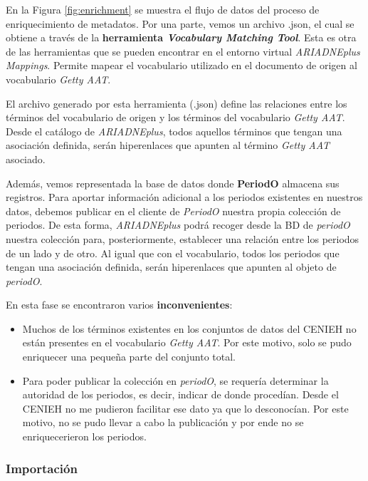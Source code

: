 En la Figura \ref{fig:enrichment} se muestra el flujo de datos del proceso de
enriquecimiento de metadatos. Por una parte, vemos un archivo .json, el
cual se obtiene a través de la \textbf{herramienta \emph{Vocabulary Matching
Tool}}. Esta es otra de las herramientas que se pueden encontrar en el
entorno virtual \emph{ARIADNEplus Mappings}. Permite mapear el vocabulario utilizado
en el documento de origen al vocabulario \emph{Getty AAT}.


El archivo generado por esta herramienta (.json) define las relaciones
entre los términos del vocabulario de origen y los términos del
vocabulario \emph{Getty AAT}. Desde el catálogo de \emph{ARIADNEplus}, todos
aquellos términos que tengan una asociación definida, serán hiperenlaces
que apunten al término \emph{Getty AAT} asociado.

Además, vemos representada la base de datos donde \textbf{PeriodO} almacena sus
registros. Para aportar información adicional a los periodos existentes
en nuestros datos, debemos publicar en el cliente de \emph{PeriodO} nuestra
propia colección de periodos. De esta forma, \emph{ARIADNEplus} podrá recoger
desde la BD de \emph{periodO} nuestra colección para, posteriormente,
establecer una relación entre los periodos de un lado y de otro. Al
igual que con el vocabulario, todos los periodos que tengan una
asociación definida, serán hiperenlaces que apunten al objeto de
\emph{periodO}.

En esta fase se encontraron varios \textbf{inconvenientes}: 

\begin{itemize}
\tightlist
\item
  Muchos de los términos existentes en los conjuntos de datos del CENIEH no están
  presentes en el vocabulario \emph{Getty AAT}. Por este motivo, solo se
  pudo enriquecer una pequeña parte del conjunto total.
\item
  Para poder publicar la colección en \emph{periodO}, se requería determinar la autoridad de
  los periodos, es decir, indicar de donde procedían. Desde el CENIEH no
  me pudieron facilitar ese dato ya que lo desconocían. Por este motivo,
  no se pudo llevar a cabo la publicación y por ende no se enriquecerieron
  los periodos.
\end{itemize}

\subsubsection{Importación}

